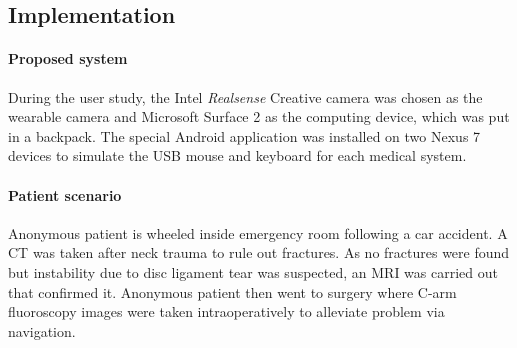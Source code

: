 {\subsection{Implementation}
\paragraph{Proposed system}
During the user study, the Intel \textit{Realsense} Creative camera was chosen as the wearable camera and Microsoft Surface 2 as the computing device, which was put in a backpack. The special Android application was installed on two Nexus 7 devices to simulate the USB mouse and keyboard for each medical system. 
\paragraph{Patient scenario}Anonymous patient is wheeled inside emergency room following a car accident. A CT was taken after neck trauma to rule out fractures. As no fractures were found but instability due to disc ligament tear was suspected, an MRI was carried out that confirmed it. Anonymous patient then went to surgery where C-arm fluoroscopy images were taken intraoperatively to alleviate problem via navigation.
}
